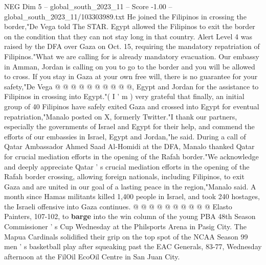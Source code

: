 \begin{textsample}{NEG Dim 5 – global\_south\_2023\_11 – Score -1.00 – global\_south\_2023\_11/103303989.txt}
He joined the Filipinos in crossing the border,"De Vega told The STAR.
Egypt allowed the Filipinos to exit the border on the condition that they can not stay long in that country.
Alert Level 4 was raised by the DFA over Gaza on Oct. 15, requiring the mandatory repatriation of Filipinos."What we are calling for is already mandatory evacuation.
Our embassy in Amman, Jordan is calling on you to go to the border and you will be allowed to cross.
If you stay in Gaza at your own free will, there is no guarantee for your safety,"De Vega @ @ @ @ @ @ @ @ @ @, Egypt and Jordan for the assistance to Filipinos in crossing into Egypt."( I ' m ) very grateful that finally, an initial group of 40 Filipinos have safely exited Gaza and crossed into Egypt for eventual repatriation,"Manalo posted on X, formerly Twitter."I thank our partners, especially the governments of Israel and Egypt for their help, and commend the efforts of our embassies in Israel, Egypt and Jordan,"he said.
During a call of Qatar Ambassador Ahmed Saad Al-Homidi at the DFA, Manalo thanked Qatar for crucial mediation efforts in the opening of the Rafah border."We acknowledge and deeply appreciate Qatar ' s crucial mediation efforts in the opening of the Rafah border crossing, allowing foreign nationals, including Filipinos, to exit Gaza and are united in our goal of a lasting peace in the region,"Manalo said.
A month since Hamas militants killed 1,400 people in Israel, and took 240 hostages, the Israeli offensive into Gaza continues. @ @ @ @ @ @ @ @ @ @ Elasto Painters, 107-102, to \textbf{barge} into the win column of the young PBA 48th Season Commissioner ' s Cup Wednesday at the Philsports Arena in Pasig City.
The Mapua Cardinals solidified their grip on the top spot of the NCAA Season 99 men ' s basketball play after squeaking past the EAC Generals, 83-77, Wednesday afternoon at the FilOil EcoOil Centre in San Juan City.

\end{textsample}
